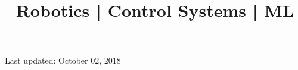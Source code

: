 \documentclass[10pt,a4paper]{moderncv}
\title{Robotics | Control Systems  | ML \newline
\bf{\lb{\footnotesize
Rerum Cognoscere Causas: To know the causes of things.} }}
\begin{document}
	\makecvtitle
	
	
	
	
	
	
	
	
	
	
	
	
%
	\vspace{0.4in}
	\footnotesize \centering Last updated: October 02, 2018
\renewcommand{\listitemsymbol}{-}
\clearpage
\end{document}
